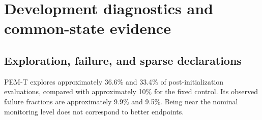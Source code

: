 \documentclass[suppldata]{interact}
\begin{document}
\hypertarget{development-diagnostics-and-common-state-evidence}{%
\section{Development diagnostics and common-state evidence}\label{development-diagnostics-and-common-state-evidence}}

\hypertarget{exploration-failure-and-sparse-declarations}{%
\subsection{Exploration, failure, and sparse declarations}\label{exploration-failure-and-sparse-declarations}}

PEM-T explores approximately 36.6\% and 33.4\% of post-initialization evaluations, compared with approximately 10\% for the fixed control. Its observed failure fractions are approximately 9.9\% and 9.5\%. Being near the nominal monitoring level does not correspond to better endpoints.

\FloatBarrier\begingroup\fontsize{8.5}{10.5}\selectfont\setlength\tabcolsep{3pt}
\end{document}
